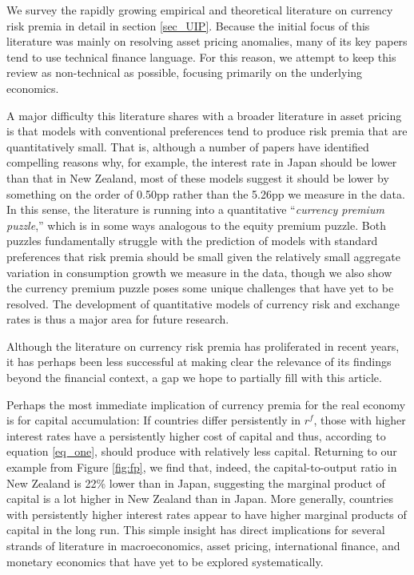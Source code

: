\documentclass{ar-1col}
\begin{document}
We survey the rapidly growing empirical and theoretical literature on currency risk premia in detail in section \ref{sec_UIP}. Because the initial focus of this literature was mainly on resolving asset pricing anomalies, many of its key papers tend to use technical finance language. For this reason, we attempt to keep this review as non-technical as possible, focusing primarily on the underlying economics.

A major difficulty this literature shares with a broader literature in asset pricing is that models with conventional preferences tend to produce risk premia that are quantitatively small. That is, although a number of papers have identified compelling reasons why, for example, the interest rate in Japan should be lower than that in New Zealand, most of these models suggest it should be lower by something on the order of 0.50pp rather than the 5.26pp we measure in the data. In this sense, the literature is running into a quantitative ``\textit{currency premium puzzle},'' which is in some ways analogous to the equity premium puzzle. Both puzzles fundamentally struggle with the prediction of models with standard preferences that risk premia should be small given the relatively small aggregate variation in consumption growth we measure in the data, though we also show the currency premium puzzle poses some unique challenges that have yet to be resolved. The development of quantitative models of currency risk and exchange rates is thus a major area for future research.

Although the literature on currency risk premia has proliferated in recent years, it has perhaps been less successful at making clear the relevance of its findings beyond the financial context, a gap we hope to partially fill with this article.

Perhaps the most immediate implication of currency premia for the real economy is for capital accumulation: If countries differ persistently in $r^f$, those with higher interest rates have a persistently higher cost of capital and thus, according to equation \ref{eq_one}, should produce with relatively less capital. Returning to our example from Figure \ref{fig:fp}, we find that, indeed, the capital-to-output ratio in New Zealand is 22\% lower than in Japan, suggesting the marginal product of capital is a lot higher in New Zealand than in Japan. More generally, countries with persistently higher interest rates appear to have higher marginal products of capital in the long run. This simple insight has direct implications for several strands of literature in macroeconomics, asset pricing, international finance, and monetary economics that have yet to be explored systematically.
\end{document}
